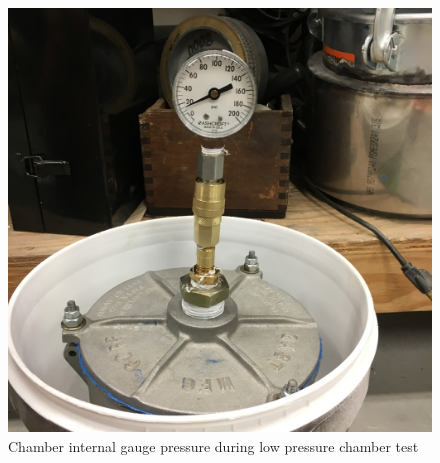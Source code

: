 \begin{figure}[h]
\centering
\includegraphics[width=1.0\columnwidth]{./img/aquaPod-test-two-pressureCheck.JPG}
\caption{Chamber internal gauge pressure during low pressure chamber test}
\label{fig:test two pressure check-1}
\end{figure}
